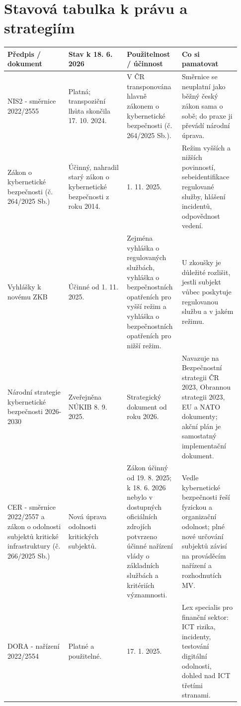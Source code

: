 \section*{Stavová tabulka k právu a strategiím}
\begin{longtable}{p{0.25\linewidth}p{0.24\linewidth}p{0.20\linewidth}p{0.24\linewidth}}
\toprule
\textbf{Předpis / dokument} & \textbf{Stav k 18. 6. 2026} & \textbf{Použitelnost / účinnost} & \textbf{Co si pamatovat}\\
\midrule
NIS2 - směrnice 2022/2555 & Platná; transpoziční lhůta skončila 17. 10. 2024. & V ČR transponována hlavně zákonem o kybernetické bezpečnosti (č. 264/2025 Sb.). & Směrnice se neuplatní jako běžný český zákon sama o sobě; do praxe ji převádí národní úprava.\\
\addlinespace
Zákon o kybernetické bezpečnosti (č. 264/2025 Sb.) & Účinný, nahradil starý zákon o kybernetické bezpečnosti z roku 2014. & 1. 11. 2025. & Režim vyšších a nižších povinností, sebeidentifikace regulované služby, hlášení incidentů, odpovědnost vedení.\\
\addlinespace
Vyhlášky k novému ZKB & Účinné od 1. 11. 2025. & Zejména vyhláška o regulovaných službách, vyhláška o bezpečnostních opatřeních pro vyšší režim a vyhláška o bezpečnostních opatřeních pro nižší režim. & U zkoušky je důležité rozlišit, jestli subjekt vůbec poskytuje regulovanou službu a v jakém režimu.\\
\addlinespace
Národní strategie kybernetické bezpečnosti 2026-2030 & Zveřejněna NÚKIB 8. 9. 2025. & Strategický dokument od roku 2026. & Navazuje na Bezpečnostní strategii ČR 2023, Obrannou strategii 2023, EU a NATO dokumenty; akční plán je samostatný implementační dokument.\\
\addlinespace
CER - směrnice 2022/2557 a zákon o odolnosti subjektů kritické infrastruktury (č. 266/2025 Sb.) & Nová úprava odolnosti kritických subjektů. & Zákon účinný od 19. 8. 2025; k 18. 6. 2026 nebylo v dostupných oficiálních zdrojích potvrzeno účinné nařízení vlády o základních službách a kritériích významnosti. & Vedle kybernetické bezpečnosti řeší fyzickou a organizační odolnost; plné nové určování subjektů závisí na prováděcím nařízení a rozhodnutích MV.\\
\addlinespace
DORA - nařízení 2022/2554 & Platné a použitelné. & 17. 1. 2025. & Lex specialis pro finanční sektor: ICT rizika, incidenty, testování digitální odolnosti, dohled nad ICT třetími stranami.\\

\end{longtable}

